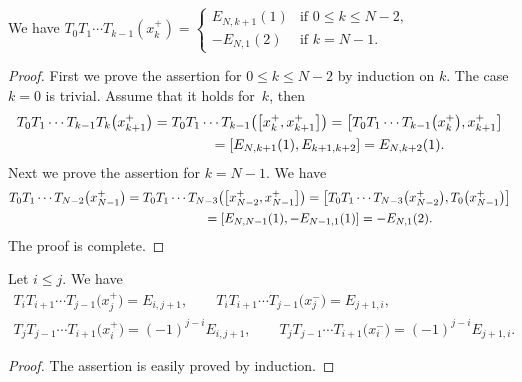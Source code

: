 \begin{lem}\label{lem:0_to_k}We have $T_0 T_1 \cdots T_{k-1} (x_k^+) = \begin{cases}
E_{N,k+1}(1) & \text{if $0 \leq k \leq N-2$},\\
-E_{N,1}(2) & \text{if $k=N-1$}.
\end{cases}$
\end{lem}
\begin{proof} First we prove the assertion for $0 \leq k \leq N-2$ by induction on $k$. The case $k=0$ is trivial. Assume that it holds for~$k$, then
\begin{gather*}
T_0 T_1 \cdots T_{k-1} T_{k} \big(x_{k+1}^+\big) = T_0 T_1 \cdots T_{k-1} \big(\big[x_{k}^+, x_{k+1}^+\big]\big) = \big[T_0 T_1 \cdots T_{k-1}\big(x_{k}^+\big), x_{k+1}^+\big] \\
\hphantom{T_0 T_1 \cdots T_{k-1} T_{k} \big(x_{k+1}^+\big)}{} = [E_{N,k+1}(1), E_{k+1,k+2}] = E_{N,k+2}(1).
\end{gather*}
Next we prove the assertion for $k=N-1$. We have
\begin{gather*}
T_0 T_1 \cdots T_{N-2} \big(x_{N-1}^+\big) = T_0 T_1 \cdots T_{N-3} \big(\big[x_{N-2}^+, x_{N-1}^+\big]\big) = \big[T_0 T_1 \cdots T_{N-3}\big(x_{N-2}^+\big), T_0\big(x_{N-1}^+\big)\big] \\
\hphantom{T_0 T_1 \cdots T_{N-2} \big(x_{N-1}^+\big)}{} = [E_{N,N-1}(1), -E_{N-1,1}(1)] = -E_{N,1}(2).
\end{gather*}
The proof is complete.
\end{proof}

\begin{lem}Let $i \leq j$. We have
\begin{gather}
T_{i} T_{i+1} \cdots T_{j-1} \big(x_{j}^+\big) = E_{i,j+1},\qquad T_{i} T_{i+1} \cdots T_{j-1} \big(x_{j}^-\big) = E_{j+1,i}, \label{eq:increase}\\
T_{j} T_{j-1} \cdots T_{i+1} \big(x_{i}^+\big) = (-1)^{j-i}E_{i,j+1},\qquad T_{j} T_{j-1} \cdots T_{i+1} \big(x_{i}^-\big) = (-1)^{j-i}E_{j+1,i}. \label{eq:decrease}
\end{gather}
\end{lem}
\begin{proof}The assertion is easily proved by induction.
\end{proof}

